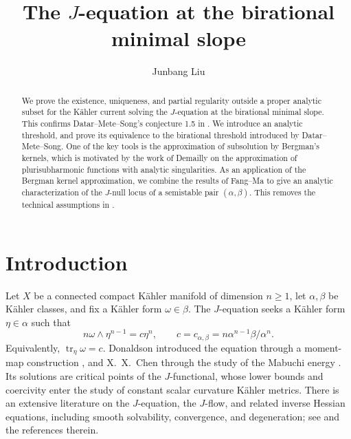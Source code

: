 \documentclass[reqno]{amsart}
\title[The J-equation at the birational minimal slope]{The $J$-equation at the birational minimal slope}
\author{Junbang Liu}
\date{}
\numberwithin{equation}{section}
\theoremstyle{definition}
\DeclareMathOperator{\tr}{tr}
\newcommand{\cab}{c_{\alpha,\beta}}
\begin{document}
\begin{abstract}
We prove the existence, uniqueness, and partial regularity outside a proper analytic subset for the K\"ahler current solving the $J$-equation at the birational minimal slope. This confirms Datar--Mete--Song's conjecture 1.5 in \cite{DMS26}. We introduce an analytic threshold, and prove its equivalence to the birational threshold introduced by Datar--Mete--Song. One of the key tools is the approximation of subsolution by Bergman's kernels, which is motivated by the work of Demailly on the approximation of plurisubharmonic functions with analytic singularities. As an application of the Bergman kernel approximation, we combine the results of Fang--Ma \cite{FM26} to give an analytic characterization of the $J$-null locus of a semistable pair $(\alpha,\beta)$. This removes the technical assumptions in \cite{L26b}.
\end{abstract}
\maketitle
\setcounter{tocdepth}{1}
{
  \hypersetup{linkcolor=black}
  \tableofcontents
}

\section{Introduction}\label{sec:intro}

Let $X$ be a connected compact K\"ahler manifold of dimension $n\ge1$, let $\alpha,\beta$ be K\"ahler classes, and fix a K\"ahler form $\omega\in\beta$. The $J$-equation seeks a K\"ahler form $\eta\in\alpha$ such that
\begin{equation}\label{eq:j-equation}
 n\omega\wedge\eta^{n-1}=c\eta^n,
 \qquad c=\cab=n{\alpha^{n-1}\beta}/{\alpha^n}.
\end{equation}
Equivalently, $\tr_\eta\omega=c$. Donaldson introduced the equation
through a moment-map construction \cite{D99}, and X.~X.~Chen through
the study of the Mabuchi energy \cite{C00,C04}. Its solutions are
critical points of the $J$-functional, whose lower bounds and
coercivity enter the study of constant scalar curvature K\"ahler
metrics. There is an extensive literature on the $J$-equation,
the $J$-flow, and related inverse Hessian equations, including
smooth solvability, convergence, and degeneration; see
\cite{W04,W06,SW08,FLM11,FL12,FL13,SW13,FLSW14,LS15,CS17,S18,
SD20,C21,DP21,S20,To23,FM24,GS24,M26a,M26b,F26,FZ26,
L26a,L26b} and the references therein.
\end{document}
